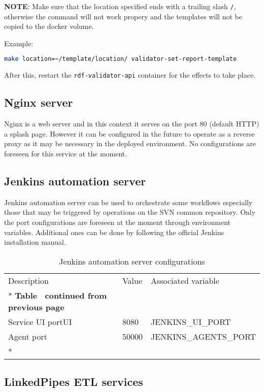 	\textbf{NOTE}: Make sure that the location specified ends with a trailing slash \texttt{/}, otherwise the command will not work propery and the templates will not be copied to the docker volume.

	Example:
	\begin{lstlisting}[language=bash]
make location=~/template/location/ validator-set-report-template
	\end{lstlisting}

	After this, restart the \texttt{rdf-validator-api} container for the effects to take place.


	\subsection{Nginx server}
	
	Nginx is a web server and in this context it serves on the port 80 (default HTTP) a splash page. However it can be configured in the future to operate as a reverse proxy as it may be necessary in the deployed environment. No configurations are foreseen for this service at the moment. 
	
	\subsection{Jenkins automation server}
	
	Jenkins automation server can be used to orchestrate some workflows especially those that may be triggered by operations on the SVN common repository. Only the port configurations are foreseen at the moment through environment variables. Additional ones can be done by following the official Jenkins installation manual. 
	
	\begin{longtable}[c]{@{}p{4cm}p{5cm}l@{}}
		\toprule
		Description & Value & Associated variable \\* \midrule
		\endfirsthead
		\multicolumn{3}{c}%
		{{\bfseries Table \thetable\ continued from previous page}} \\
		\endhead
		Service UI portUI & 8080 & JENKINS\_UI\_PORT \\
		Agent port & 50000 & JENKINS\_AGENTS\_PORT \\* \bottomrule
		\caption{Jenkins automation server configurations}
		\label{tab:my-table4}\\
	\end{longtable}
	
	\subsection{LinkedPipes ETL services}
	

